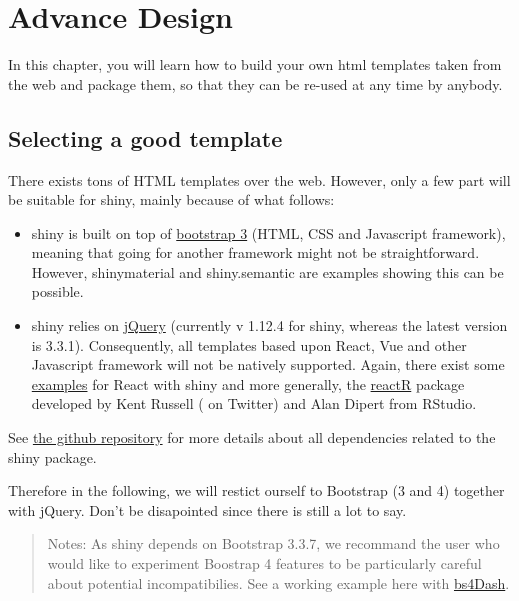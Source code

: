 \documentclass[]{book}
\providecommand{\tightlist}{%
  \setlength{\itemsep}{0pt}\setlength{\parskip}{0pt}}
\begin{document}
\hypertarget{advance-design}{%
\chapter{Advance Design}\label{advance-design}}

In this chapter, you will learn how to build your own html templates taken from the web
and package them, so that they can be re-used at any time by anybody.

\hypertarget{selecting-a-good-template}{%
\section{Selecting a good template}\label{selecting-a-good-template}}

There exists tons of HTML templates over the web. However, only a few part will be suitable
for shiny, mainly because of what follows:

\begin{itemize}
\tightlist
\item
  shiny is built on top of \href{https://getbootstrap.com/docs/3.3/}{bootstrap 3} (HTML, CSS and Javascript framework), meaning that going for another framework might
  not be straightforward. However, shinymaterial and shiny.semantic are examples showing
  this can be possible.
\item
  shiny relies on \href{https://jquery.com}{jQuery} (currently v 1.12.4 for shiny, whereas the latest version is 3.3.1). Consequently, all templates based upon React, Vue and other Javascript framework will not be natively supported. Again, there exist some \href{https://github.com/alandipert/react-widget-demo/blob/master/app.R}{examples} for React with shiny and more generally,
  the \href{https://react-r.github.io/reactR/}{reactR} package developed by Kent Russell (\citet{timelyportfolio} on Twitter) and Alan Dipert from RStudio.
\end{itemize}

See \href{https://github.com/rstudio/shiny/tree/master/inst/www/shared}{the github repository} for more details about all dependencies related to the shiny package.

Therefore in the following, we will restict ourself to Bootstrap (3 and 4) together with jQuery. Don't be disapointed since there is still a lot to say.

\begin{quote}
Notes: As shiny depends on Bootstrap 3.3.7, we recommand the user who would like to
experiment Boostrap 4 features to be particularly careful about potential incompatibilies.
See a working example here with \href{https://github.com/RinteRface/bs4Dash}{bs4Dash}.
\end{quote}
\end{document}
